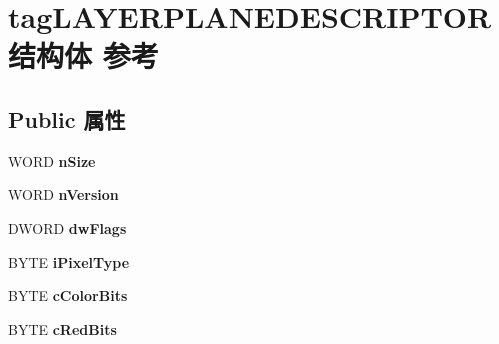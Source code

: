 \hypertarget{structtag_l_a_y_e_r_p_l_a_n_e_d_e_s_c_r_i_p_t_o_r}{}\section{tag\+L\+A\+Y\+E\+R\+P\+L\+A\+N\+E\+D\+E\+S\+C\+R\+I\+P\+T\+O\+R结构体 参考}
\label{structtag_l_a_y_e_r_p_l_a_n_e_d_e_s_c_r_i_p_t_o_r}
\subsection*{Public 属性}
\begin{DoxyCompactItemize}
\item 
\mbox{\label{structtag_l_a_y_e_r_p_l_a_n_e_d_e_s_c_r_i_p_t_o_r_ae8c27a07c1d294f5095904cb76d1bfb6}} 
W\+O\+RD {\bfseries n\+Size}
\item 
\mbox{\label{structtag_l_a_y_e_r_p_l_a_n_e_d_e_s_c_r_i_p_t_o_r_af67caf01d4d9f7749f7181f8f561cca6}} 
W\+O\+RD {\bfseries n\+Version}
\item 
\mbox{\label{structtag_l_a_y_e_r_p_l_a_n_e_d_e_s_c_r_i_p_t_o_r_a5eee6e35e887738d6590ab544c9bf3e9}} 
D\+W\+O\+RD {\bfseries dw\+Flags}
\item 
\mbox{\label{structtag_l_a_y_e_r_p_l_a_n_e_d_e_s_c_r_i_p_t_o_r_aff50005b3a9ab3cfbf87040d45471249}} 
B\+Y\+TE {\bfseries i\+Pixel\+Type}
\item 
\mbox{\label{structtag_l_a_y_e_r_p_l_a_n_e_d_e_s_c_r_i_p_t_o_r_ab7039a7383d6005a3de745cae4d8f0fe}} 
B\+Y\+TE {\bfseries c\+Color\+Bits}
\item 
\mbox{\label{structtag_l_a_y_e_r_p_l_a_n_e_d_e_s_c_r_i_p_t_o_r_a2960d51eaefe906b4beb052798dec61e}} 
B\+Y\+TE {\bfseries c\+Red\+Bits}
\item 
\mbox{\label{structtag_l_a_y_e_r_p_l_a_n_e_d_e_s_c_r_i_p_t_o_r_a96bd7f195d6742ca0b3bc6f2efe01fc9}} 

\end{DoxyCompactItemize}

